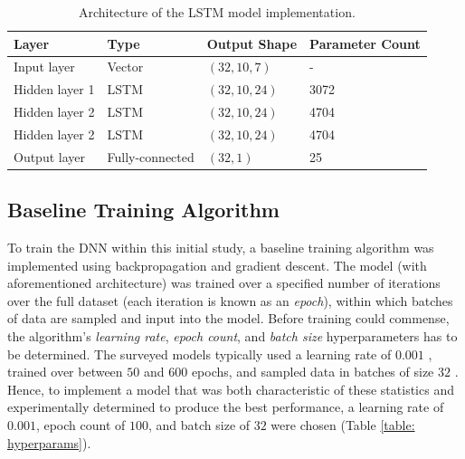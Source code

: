 \documentclass[a4paper, 11pt]{report}
\begin{document}
    \begin{table}[ht]
        \centering
        \begin{tabular}{|l|l|l|l|} 
        \hline
        \textbf{Layer} & \textbf{Type} & \textbf{Output Shape}   & \textbf{Parameter Count}  \\ 
        \hline
        Input layer    & Vector        & $(32, 10, 7)$  & -                         \\ 
        \hline
        Hidden layer 1 & LSTM          & $(32, 10, 24)$ & 3072                      \\ 
        \hline
        Hidden layer 2 & LSTM          & $(32, 10, 24)$ & 4704                      \\ 
        \hline
        Hidden layer 2 & LSTM          & $(32, 10, 24)$ & 4704                      \\ 
        \hline
        Output layer   & Fully-connected           & $(32, 1)$      & 25                        \\
        \hline
        \end{tabular}
        \caption{\centering Architecture of the LSTM model implementation.}
        \label{table: architecture}
    \end{table}

    \subsection{Baseline Training Algorithm}

    To train the DNN within this initial study, a baseline training algorithm was implemented using backpropagation and gradient descent. The model (with aforementioned architecture) was trained over a specified number of iterations over the full dataset (each iteration is known as an \emph{epoch}), within which batches of data are sampled and input into the model. Before training could commense, the algorithm's \emph{learning rate}, \emph{epoch count}, and \emph{batch size} hyperparameters has to be determined. The surveyed models typically used a learning rate of $0.001$ \citep{zhang-2022}, trained over between $50$ \citep{rahimikia-2020} and $600$ \citep{xiong-2016} epochs, and sampled data in batches of size $32$ \citep{xiong-2016}. Hence, to implement a model that was both characteristic of these statistics and experimentally determined to produce the best performance, a learning rate of $0.001$, epoch count of $100$, and batch size of $32$ were chosen (Table  \ref{table: hyperparams}).
\end{document}
